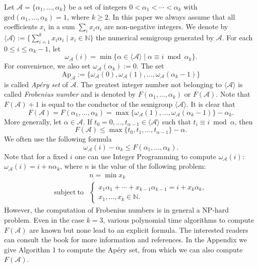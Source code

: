 \documentclass[11pt]{article}
\def\gcd{\mathrm{gcd}}
\def\Acal{{\mathcal A}}
\def\Nset{{\mathbb N}}
\theoremstyle{remark}
\theoremstyle{definition}
\begin{document}
Let $\Acal = \{ \alpha_1,  \ldots , \alpha_k \} $  be a set of integers $0<  \alpha_1 < \cdots < \alpha_k$ with $\gcd(\alpha_1,\ldots,\alpha_k) = 1$, where $k\ge 2$. In this paper we always assume that all coefficients $x_i$ in a sum $\sum_i x_i\alpha_i$ are non-negative integers.
We denote by $\langle \Acal \rangle := \{\sum_{i=1}^k x_i\alpha_i \mid x_i\in \Nset\}$ the numerical semigroup generated by $\Acal$. For each $0 \le i \le \alpha_k -1$, let
$$\omega_{\Acal}(i) = \min\{ \alpha \in \langle \Acal \rangle \mid  \alpha \equiv i \bmod \alpha_k \}.$$
For convenience, we also set $ \omega_{\Acal}(\alpha_k)   := 0$. The set 
$$\mathrm{Ap}_{\Acal} := \{ \omega_{\Acal}(0), \omega_{\Acal}(1),\ldots, \omega_{\Acal}(\alpha_k -1) \}$$  is called  {\it Ap\'ery set} of $\Acal$.
The greatest integer number not belonging to $\langle \Acal \rangle $ is called  {\it Frobenius number} and is denoted by $F( \alpha_1, \ldots ,\alpha_k)$ or $F(\Acal)$. Note that $F(\Acal) + 1$ is equal to the conductor of  the semigroup $\langle \Acal \rangle$. It is clear that
$$F(\Acal) = F( \alpha_1, \ldots ,\alpha_k) = \max\{\omega_{\Acal}(1),\ldots, \omega_{\Acal}(\alpha_k -1) \} - \alpha_k .$$
 More generally, let $\alpha\in \Acal$. If $t_0 = 0,\ldots,t_{\alpha -1} \in \langle \Acal \rangle$ such that $t_i \equiv i \bmod \alpha$, then 
 \begin{equation}\label{EAp0}
 F(\Acal) \le \max\{t_0, t_1,\ldots,t_{\alpha -1}\} - \alpha.
 \end{equation}
We often use the following formula
\begin{equation}\label{EAp1}
\omega_{\Acal}(i) - \alpha_k \le F( \alpha_1, \ldots ,\alpha_k).
\end{equation}
Note that for a fixed $i$ one can use Integer Programming to compute $\omega_{\Acal}(i)$: $\omega_{\Acal}(i) = i + n  \alpha_k$, where $n$ is the value of the following problem: 
$$\begin{array}{cc}
& n = \min  x_k       \\
{\mathrm{subject\  to} }     &  \begin{cases}
x_1\alpha_1 + \cdots + x_{k-1}\alpha_{k-1} = i + x_k \alpha_k,\\
x_1,\ldots,x_k  \in \Nset.
\end{cases}
\end{array}$$
However, the computation of Frobenius numbers is in general a NP-hard problem. Even in the case $k=3$, various polynomial time algorithms to compute $F(\Acal)$ are known but none lead to an explicit formula. The interested  readers can consult the book \cite{Ra} for more information and references. In the Appendix we give Algorithm 1 to compute the Ap\'ery set, from which we can also compute $F(\Acal)$.
\end{document}

